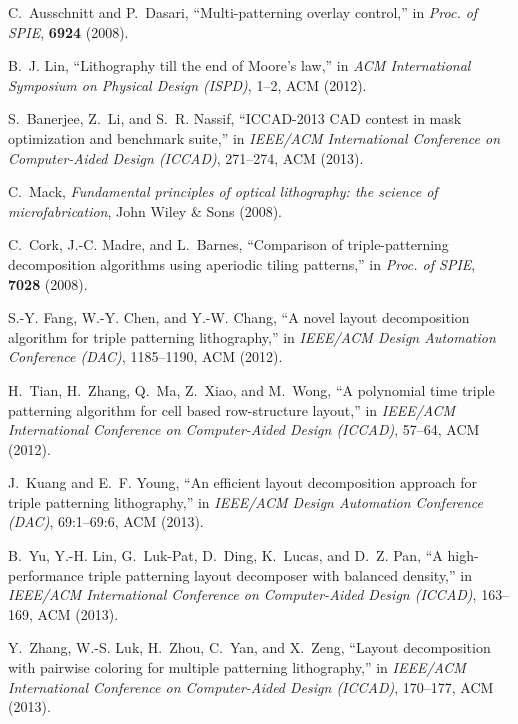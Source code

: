 \documentclass[12pt]{spieman}
\theoremstyle{plain}
\begin{document}
\begin{spacing}{1}
\begin{thebibliography}{10}
C.~Ausschnitt and P.~Dasari, ``Multi-patterning overlay control,'' in {\em
  Proc. of SPIE},   {\bf 6924}  (2008).

B.~J. Lin, ``Lithography till the end of {Moore}'s law,'' in {\em ACM
  International Symposium on Physical Design (ISPD)},  1--2, ACM  (2012).

S.~Banerjee, Z.~Li, and S.~R. Nassif, ``{ICCAD-2013 CAD} contest in mask
  optimization and benchmark suite,'' in {\em IEEE/ACM International Conference
  on Computer-Aided Design (ICCAD)},  271--274, ACM  (2013).

C.~Mack, {\em Fundamental principles of optical lithography: the science of
  microfabrication}, John Wiley \& Sons  (2008).

C.~Cork, J.-C. Madre, and L.~Barnes, ``Comparison of triple-patterning
  decomposition algorithms using aperiodic tiling patterns,'' in {\em Proc. of
  SPIE},   {\bf 7028}  (2008).

S.-Y. Fang, W.-Y. Chen, and Y.-W. Chang, ``A novel layout decomposition
  algorithm for triple patterning lithography,'' in {\em IEEE/ACM Design
  Automation Conference (DAC)},  1185--1190, ACM  (2012).

H.~Tian, H.~Zhang, Q.~Ma, Z.~Xiao, and M.~Wong, ``A polynomial time triple
  patterning algorithm for cell based row-structure layout,'' in {\em IEEE/ACM
  International Conference on Computer-Aided Design (ICCAD)},  57--64, ACM
  (2012).

J.~Kuang and E.~F. Young, ``An efficient layout decomposition approach for
  triple patterning lithography,'' in {\em IEEE/ACM Design Automation
  Conference (DAC)},  69:1--69:6, ACM  (2013).

B.~Yu, Y.-H. Lin, G.~Luk-Pat, D.~Ding, K.~Lucas, and D.~Z. Pan, ``A
  high-performance triple patterning layout decomposer with balanced density,''
  in {\em IEEE/ACM International Conference on Computer-Aided Design (ICCAD)},
  163--169, ACM  (2013).

Y.~Zhang, W.-S. Luk, H.~Zhou, C.~Yan, and X.~Zeng, ``Layout decomposition with
  pairwise coloring for multiple patterning lithography,'' in {\em IEEE/ACM
  International Conference on Computer-Aided Design (ICCAD)},  170--177, ACM
  (2013).


\end{thebibliography}
\end{spacing}
\end{document}
